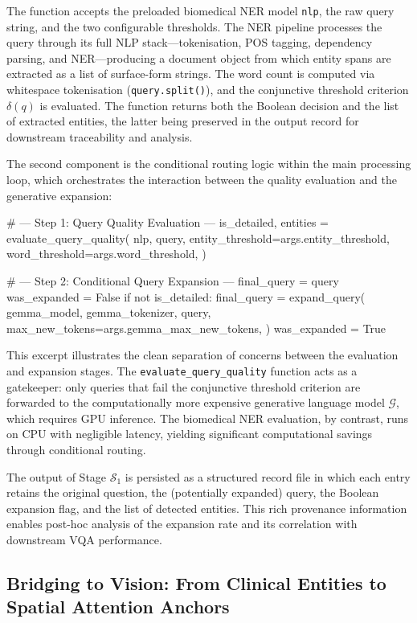 The function accepts the preloaded biomedical NER model \texttt{nlp}, the raw query string, and the two configurable thresholds. The NER pipeline processes the query through its full NLP stack---tokenisation, POS tagging, dependency parsing, and NER---producing a document object from which entity spans are extracted as a list of surface-form strings. The word count is computed via whitespace tokenisation (\texttt{query.split()}), and the conjunctive threshold criterion $\delta(q)$ is evaluated. The function returns both the Boolean decision and the list of extracted entities, the latter being preserved in the output record for downstream traceability and analysis.

The second component is the conditional routing logic within the main processing loop, which orchestrates the interaction between the quality evaluation and the generative expansion:

\begin{pythoncode}
# --- Step 1: Query Quality Evaluation ---
is_detailed, entities = evaluate_query_quality(
    nlp, query,
    entity_threshold=args.entity_threshold,
    word_threshold=args.word_threshold,
)

# --- Step 2: Conditional Query Expansion ---
final_query = query
was_expanded = False
if not is_detailed:
    final_query = expand_query(
        gemma_model, gemma_tokenizer,
        query,
        max_new_tokens=args.gemma_max_new_tokens,
    )
    was_expanded = True
\end{pythoncode}

This excerpt illustrates the clean separation of concerns between the evaluation and expansion stages. The \texttt{evaluate\_query\_quality} function acts as a gatekeeper: only queries that fail the conjunctive threshold criterion are forwarded to the computationally more expensive generative language model $\mathcal{G}$, which requires GPU inference. The biomedical NER evaluation, by contrast, runs on CPU with negligible latency, yielding significant computational savings through conditional routing.

The output of Stage $\mathcal{S}_1$ is persisted as a structured record file in which each entry retains the original question, the (potentially expanded) query, the Boolean expansion flag, and the list of detected entities. This rich provenance information enables post-hoc analysis of the expansion rate and its correlation with downstream VQA performance.

\subsection{Bridging to Vision: From Clinical Entities to Spatial Attention Anchors}
\label{sec:3_2_5}

